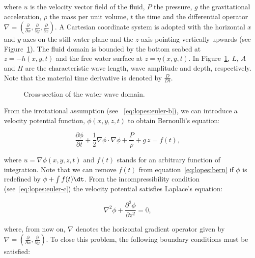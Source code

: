 where $u$ is the velocity vector field of the fluid, $P$ the pressure,
$g$ the gravitational acceleration, $\rho$ the mass per unit volume,
$t$ the time and the differential operator
$\nabla=\left(\frac{\partial }{\partial x},\frac{\partial }{\partial
y},\frac{\partial }{\partial z}\right).$ A Cartesian coordinate system
is adopted with the horizontal $x$ and $y$-axes on the still water
plane and the $z$-axis pointing vertically upwards (see
Figure~\ref{fig:lopes:schematic}).  The fluid domain is bounded by the
bottom seabed at $z=-h(x,y,t)$ and the free water surface at
$z=\eta(x,y,t)$.  In Figure~\ref{fig:lopes:schematic}, $L$, $A$ and
$H$ are the characteristic wave length, wave amplitude and depth,
respectively. Note that the material time derivative is denoted by
$\frac{D}{D t}$.

\begin{figure}
  \centering
  \caption{Cross-section of the water wave domain.}
  \label{fig:lopes:schematic}
\end{figure}

From the irrotational assumption (see ~\eqref{eq:lopes:euler-b}), we
can introduce a velocity potential function,
$\phi(x,y,z,t)$ to obtain Bernoulli's equation:

\begin{equation}
\label{eq:lopes:bern}
\frac{\partial \phi}{\partial t}+\frac{1}{2}\nabla \phi \cdot\nabla
\phi + \frac{P}{\rho} +g\, z=f(t),
\end{equation}

where $u=\nabla\phi(x,y,z,t)$ and $f(t)$ stands for an arbitrary
function of integration.  Note that we can remove $f(t)$ from
equation~\eqref{eq:lopes:bern} if $\phi$ is redefined by $\phi+\int
f(t) \dt$.  From the incompressibility condition
(see~\eqref{eq:lopes:euler-c}) the velocity potential satisfies
Laplace's equation:

\begin{equation}
  \label{eq:lopes:lap}
  \nabla^2\phi+\frac{\partial^2\phi}{\partial z^2}=0,
\end{equation}

where, from now on, $\nabla$ denotes the horizontal gradient operator
given by $\nabla=\left(\frac{\partial }{\partial
    x},\frac{\partial}{\partial y}\right)\!\!.$ To close this problem,
the following boundary conditions must be satisfied:

